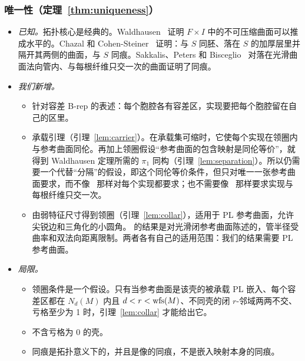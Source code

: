 \subsubsection*{唯一性（定理~\ref{thm:uniqueness}）}
\begin{itemize}
\item \emph{已知。}拓扑核心是经典的。Waldhausen~\cite[Prop.~3.1]{Waldhausen68} 证明 $F\times I$ 中的不可压缩曲面可以推成水平的。Chazal 和 Cohen-Steiner~\cite[Thm.~2.1]{CCS05} 证明：与 $S$ 同胚、落在 $S$ 的加厚层里并隔开其两侧的曲面，与 $S$ 同痕。Sakkalis、Peters 和 Bisceglio~\cite[Thm.~10]{SPB04} 对落在光滑曲面法向管内、与每根纤维只交一次的曲面证明了同痕。
\item \emph{我们新增。}
  \begin{itemize}
  \item 针对容差 B-rep 的表述：每个胞腔各有容差区，实现要把每个胞腔留在自己的区里。
  \item 承载引理（引理~\ref{lem:carrier}）。在承载集可缩时，它使每个实现在领圈内与参考曲面同伦。再加上领圈假设``参考曲面的包含映射是同伦等价''，就得到 Waldhausen 定理所需的 $\pi_1$ 同构（引理~\ref{lem:separation}）。所以仍需要一个代替``分隔''的假设，即这个同伦等价条件，但只对唯一一张参考曲面要求，而不像~\cite{CCS05} 那样对每个实现都要求；也不需要像~\cite{SPB04} 那样要求实现与每根纤维只交一次。
  \item 由弱特征尺寸得到领圈（引理~\ref{lem:collar}），适用于 PL 参考曲面，允许尖锐边和三角化的小圆角。\cite{SPB04} 的结果是对光滑闭参考曲面陈述的，管半径受曲率和双法向距离限制。两者各有自己的适用范围：我们的结果需要 PL 参考曲面。
  \end{itemize}
\item \emph{局限。}
  \begin{itemize}
  \item 领圈条件是一个假设。只有当参考曲面是该壳的被承载 PL 嵌入、每个容差区都在 $N_d(M)$ 内且 $d<r<\operatorname{wfs}(M)$、不同壳的闭 $r$-邻域两两不交、亏格至少为 1 时，引理~\ref{lem:collar} 才能给出它。
  \item 不含亏格为 0 的壳。
  \item 同痕是拓扑意义下的，并且是像的同痕，不是嵌入映射本身的同痕。
  \end{itemize}
\end{itemize}

